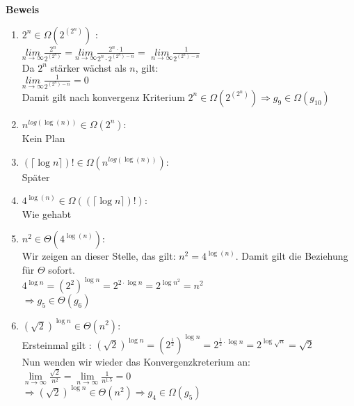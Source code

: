 \documentclass[11pt,a4paper,ngerman]{article}
\begin{document}
\begin{description}
\item{\textbf{Beweis}} 
\begin{enumerate}

\item
$  2^n  \in \Omega (2^{(2^n)})$ : \\
$\underset{n\rightarrow\infty}{lim} \frac{2^n}{2^{(2^n)}} = \underset{n\rightarrow\infty}{lim} \frac{2^n \cdot 1}{2^n \cdot 2^{(2^n) - n}} = $
$ \underset{n\rightarrow\infty}{lim} \frac{1}{2^{(2^n) - n}}$\\
Da $2^n$ stärker wächst als $n$, gilt:\\
$ \underset{n\rightarrow\infty}{lim} \frac{1}{2^{(2^n) - n}} = 0$\\
Damit gilt nach konvergenz Kriterium $2^n \in \Omega (2^{(2^n)})\Rightarrow g_9 \in \Omega (g_{10})$

\item
$ n^{log{(\log{(n)})}} \in \Omega (2^n)$: \\
Kein Plan

\item
$(\lceil \log{n} \rceil)! \in \Omega (n^{log{(\log{(n)})}})$: \\
Später

\item
$4^{\log{(n)}} \in \Omega ((\lceil \log{n} \rceil)!)$: \\
Wie gehabt

\item
$n^2 \in \Theta (4^{\log{(n)}})$: \\
Wir zeigen an dieser Stelle, das gilt: $n^2 = 4^{\log{(n)}}$. Damit gilt die Beziehung für $\Theta$ sofort.\\
$4^{\log n} = (2^2)^{\log n} =  2^{2\cdot \log n} = 2^{\log n^2} = n^2$\\
$\Rightarrow g_5 \in \Theta (g_6)$

\item
$(\sqrt{2})^{\log{n}} \in \Theta (n^2)$:\\
Ersteinmal gilt : $(\sqrt{2})^{\log{n}} = (2^{\frac{1}{2}})^{\log n} = 2^{\frac{1}{2} \cdot \log n} = 2^{\log \sqrt{n}} = \sqrt{2}$\\
Nun wenden wir wieder das Konvergenzkreterium an: \\
$\underset{n\rightarrow\infty}{\lim} \frac{\sqrt{2}}{n^2} = \underset{n\rightarrow\infty}{\lim} \frac{1}{n^{1.5}} = 0$\\
$\Rightarrow (\sqrt{2})^{\log{n}} \in \Theta (n^2) \Rightarrow g_4 \in \Omega (g_5)$


\end{enumerate}
\end{description}
\end{document}
